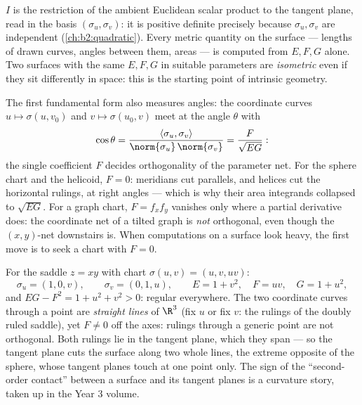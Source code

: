 \begin{remark}
$I$ is the restriction of the ambient Euclidean scalar product to
the tangent plane, read in the basis $(\sigma_u, \sigma_v)$: it is
positive definite precisely because $\sigma_u, \sigma_v$ are
independent (\cref{ch:b2:quadratic}). Every metric quantity on the
surface --- lengths of drawn curves, angles between them, areas ---
is computed from $E, F, G$ alone. Two surfaces with the same $E,
F, G$ in suitable parameters are \emph{isometric} even if they sit
differently in space: this is the starting point of intrinsic
geometry.
\end{remark}

\begin{example}\label{ex:b2:surfaces:coordangle}
The first fundamental form also measures angles: the
coordinate curves $u \mapsto \sigma(u, v_0)$ and $v \mapsto
\sigma(u_0, v)$ meet at the angle $\theta$ with
\[
\cos\theta = \frac{\langle\sigma_u,
\sigma_v\rangle}{\norm{\sigma_u}\,\norm{\sigma_v}}
= \frac{F}{\sqrt{EG}} :
\]
the single coefficient $F$ decides orthogonality of the
parameter net. For the sphere chart and the helicoid, $F =
0$: meridians cut parallels, and helices cut the horizontal
rulings, at right angles --- which is why their area
integrands collapsed to $\sqrt{EG}$. For a graph chart,
$F = f_xf_y$ vanishes only where a partial derivative does:
the coordinate net of a tilted graph is \emph{not}
orthogonal, even though the $(x, y)$-net downstairs is. When
computations on a surface look heavy, the first move is to
seek a chart with $F = 0$.
\end{example}

\begin{example}\label{ex:b2:surfaces:saddlechart}
For the saddle $z = xy$ with chart $\sigma(u, v) = (u, v,
uv)$:
\[
\sigma_u = (1, 0, v), \qquad \sigma_v = (0, 1, u),
\qquad
E = 1 + v^2, \quad F = uv, \quad G = 1 + u^2 ,
\]
and $EG - F^2 = 1 + u^2 + v^2 > 0$: regular everywhere. The
two coordinate curves through a point are \emph{straight
lines} of $\R^3$ (fix $u$ or fix $v$: the rulings of the
doubly ruled saddle), yet $F \neq 0$ off the axes: rulings
through a generic point are not orthogonal. Both rulings lie
in the tangent plane, which they span --- so the tangent
plane cuts the surface along two whole lines, the extreme
opposite of the sphere, whose tangent planes touch at one
point only. The sign of the ``second-order contact'' between
a surface and its tangent planes is a curvature story,
taken up in the Year 3 volume.
\end{example}

